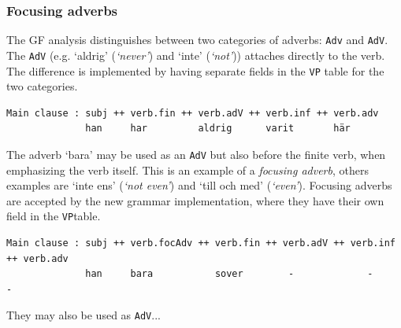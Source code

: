 \documentclass{report}
\begin{document}
\subsubsection{Focusing adverbs}
The GF analysis distinguishes between two categories of adverbs: \verb-Adv- 
and \verb-AdV-. %
The \verb-AdV- (e.g. `aldrig' (\emph{`never'}) and `inte' (\emph{`not'}))
attaches directly to the verb.
The difference is implemented by having separate fields in the \verb-VP- table
for the two categories.
\begin{verbatim}
Main clause : subj ++ verb.fin ++ verb.adV ++ verb.inf ++ verb.adv
              han     har         aldrig      varit       här 
\end{verbatim}
The adverb `bara' may be used as an \verb-AdV- but also before the finite verb,
when emphasizing the verb itself.
This is an example of a \textit{focusing adverb}, others examples are `inte ens' (\emph{`not even'})
and `till och med' (\emph{`even'}).
Focusing adverbs are accepted by the new grammar implementation, where they have
their own field in the \verb-VP-table.
\begin{verbatim}
Main clause : subj ++ verb.focAdv ++ verb.fin ++ verb.adV ++ verb.inf ++ verb.adv
              han     bara           sover        -             -           -
\end{verbatim}
They may also be used as \verb-AdV-...
\end{document}

